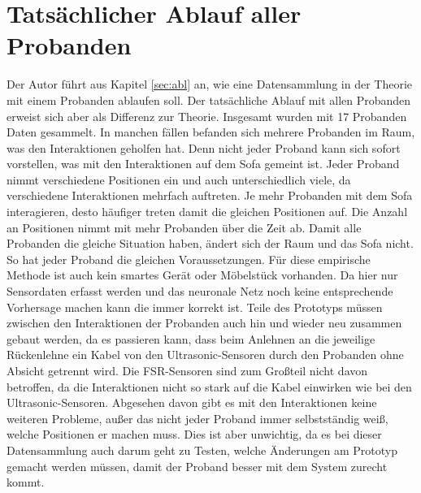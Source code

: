 \newpage

\section{Tatsächlicher Ablauf aller Probanden}
\label{sub:real}
Der Autor führt aus Kapitel \ref{sec:abl} an, wie eine Datensammlung in der Theorie mit einem Probanden ablaufen soll. Der tatsächliche Ablauf mit allen Probanden erweist sich aber als Differenz zur Theorie. Insgesamt wurden mit 17 Probanden Daten gesammelt. In manchen fällen befanden sich mehrere Probanden im Raum, was den Interaktionen geholfen hat. Denn nicht jeder Proband kann sich sofort vorstellen, was mit den Interaktionen auf dem Sofa gemeint ist.
\newline
Jeder Proband nimmt verschiedene Positionen ein und auch unterschiedlich viele, da verschiedene Interaktionen mehrfach auftreten. Je mehr Probanden mit dem Sofa interagieren, desto häufiger treten damit die gleichen Positionen auf. Die Anzahl an Positionen nimmt mit mehr Probanden über die Zeit ab. Damit alle Probanden die gleiche Situation haben, ändert sich der Raum und das Sofa nicht. So hat jeder Proband die gleichen Voraussetzungen. Für diese empirische Methode ist auch kein smartes Gerät oder Möbelstück vorhanden. Da hier nur Sensordaten erfasst werden und das neuronale Netz noch keine entsprechende Vorhersage machen kann die immer korrekt ist.
\newline
Teile des Prototyps müssen zwischen den Interaktionen der Probanden auch hin und wieder neu zusammen gebaut werden, da es passieren kann, dass beim Anlehnen an die jeweilige Rückenlehne ein Kabel von den Ultrasonic-Sensoren durch den Probanden ohne Absicht getrennt wird. Die FSR-Sensoren sind zum Großteil nicht davon betroffen, da die Interaktionen nicht so stark auf die Kabel einwirken wie bei den Ultrasonic-Sensoren. Abgesehen davon gibt es mit den Interaktionen keine weiteren Probleme, außer das nicht jeder Proband immer selbstständig weiß, welche Positionen er machen muss. Dies ist aber unwichtig, da es bei dieser Datensammlung auch darum geht zu Testen, welche Änderungen am Prototyp gemacht werden müssen, damit der Proband besser mit dem System zurecht kommt.


